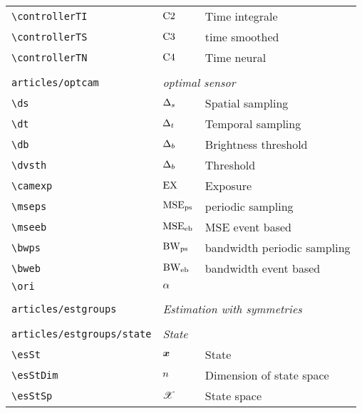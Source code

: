 \begin{longtable}{lll}
 {\color[rgb]{0.5,0.5,0.5}\texttt{\textbackslash controllerTI}} & $\text{C2}$ &  Time integrale\\ 
 {\color[rgb]{0.5,0.5,0.5}\texttt{\textbackslash controllerTS}} & $\text{C3}$ &  time smoothed\\ 
 {\color[rgb]{0.5,0.5,0.5}\texttt{\textbackslash controllerTN}} & $\text{C4}$ &  Time neural\\ 
  &  & \\ 
 {\color[rgb]{0.5,0.5,0.5}\texttt{articles/optcam}} & \multicolumn{2}{l}{\emph{optimal sensor}}\\ 
 \hline
{\color[rgb]{0.5,0.5,0.5}\texttt{\textbackslash ds}} & $\Delta_s$ &  Spatial sampling\\ 
 {\color[rgb]{0.5,0.5,0.5}\texttt{\textbackslash dt}} & $\Delta_t$ &  Temporal sampling\\ 
 {\color[rgb]{0.5,0.5,0.5}\texttt{\textbackslash db}} & $\Delta_b$ &  Brightness threshold\\ 
 {\color[rgb]{0.5,0.5,0.5}\texttt{\textbackslash dvsth}} & $\Delta_b$ &  Threshold\\ 
 {\color[rgb]{0.5,0.5,0.5}\texttt{\textbackslash camexp}} & $\text{EX}$ &  Exposure\\ 
 {\color[rgb]{0.5,0.5,0.5}\texttt{\textbackslash mseps}} & $\text{MSE}_{\text{ps}}$ &  periodic sampling\\ 
 {\color[rgb]{0.5,0.5,0.5}\texttt{\textbackslash mseeb}} & $\text{MSE}_{\text{eb}}$ &  MSE event based\\ 
 {\color[rgb]{0.5,0.5,0.5}\texttt{\textbackslash bwps}} & $\text{BW}_{\text{ps}}$ &  bandwidth periodic sampling\\ 
 {\color[rgb]{0.5,0.5,0.5}\texttt{\textbackslash bweb}} & $\text{BW}_{\text{eb}}$ &  bandwidth event based\\ 
 {\color[rgb]{0.5,0.5,0.5}\texttt{\textbackslash ori}} & $\alpha$ & \\ 
  &  & \\ 
 {\color[rgb]{0.5,0.5,0.5}\texttt{articles/estgroups}} & \multicolumn{2}{l}{\emph{Estimation with symmetries}}\\ 
 \hline
 &  & \\ 
 {\color[rgb]{0.5,0.5,0.5}\texttt{articles/estgroups/state}} & \multicolumn{2}{l}{\emph{State}}\\ 
 \hline
{\color[rgb]{0.5,0.5,0.5}\texttt{\textbackslash esSt}} & $\boldsymbol{x}$ &  State\\ 
 {\color[rgb]{0.5,0.5,0.5}\texttt{\textbackslash esStDim}} & $n$ &  Dimension of state space\\ 
 {\color[rgb]{0.5,0.5,0.5}\texttt{\textbackslash esStSp}} & $\mathscr{X}$ &  State space\\ 

\end{longtable}
